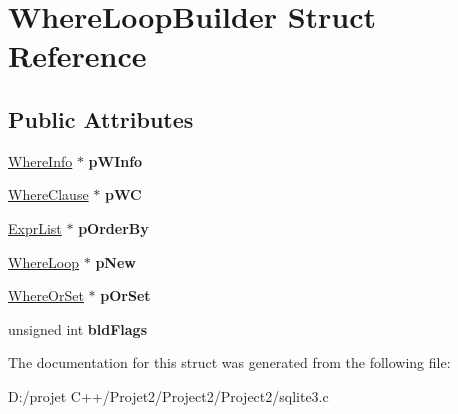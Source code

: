 \hypertarget{struct_where_loop_builder}{}\section{Where\+Loop\+Builder Struct Reference}
\label{struct_where_loop_builder}
\subsection*{Public Attributes}
\begin{DoxyCompactItemize}
\item 
\mbox{\label{struct_where_loop_builder_a45e1ed33ef11ee2c08af6edcda9e5654}} 
\mbox{\hyperlink{struct_where_info}{Where\+Info}} $\ast$ {\bfseries p\+W\+Info}
\item 
\mbox{\label{struct_where_loop_builder_aff76c3f8b34e4588c587708d59fb6bc9}} 
\mbox{\hyperlink{struct_where_clause}{Where\+Clause}} $\ast$ {\bfseries p\+WC}
\item 
\mbox{\label{struct_where_loop_builder_a16de740f297add3d4b36905c21554a86}} 
\mbox{\hyperlink{struct_expr_list}{Expr\+List}} $\ast$ {\bfseries p\+Order\+By}
\item 
\mbox{\label{struct_where_loop_builder_ae3ab5ddb99b1d4697f573e9b25442f65}} 
\mbox{\hyperlink{struct_where_loop}{Where\+Loop}} $\ast$ {\bfseries p\+New}
\item 
\mbox{\label{struct_where_loop_builder_adf94dbe3918353f2d9ebfc0bf69d9685}} 
\mbox{\hyperlink{struct_where_or_set}{Where\+Or\+Set}} $\ast$ {\bfseries p\+Or\+Set}
\item 
\mbox{\label{struct_where_loop_builder_af22ad9c5a89e144a9ff290b8248b14b4}} 
unsigned int {\bfseries bld\+Flags}
\end{DoxyCompactItemize}


The documentation for this struct was generated from the following file\+:\begin{DoxyCompactItemize}
\item 
D\+:/projet C++/\+Projet2/\+Project2/\+Project2/sqlite3.\+c\end{DoxyCompactItemize}
